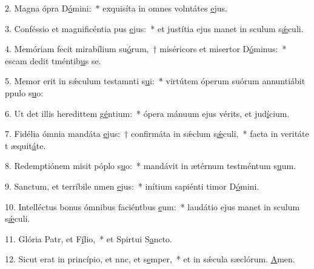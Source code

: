 2. Magna ópra D\uline{ó}mini:~* exquisíta in omnes volntátes \uline{e}jus.\par 
3. Conféssio et magnificéntia pus \uline{e}jus:~* et justítia ejus manet in sculum s\uline{ǽ}culi.\par 
4. Memóriam fecit mirabílium su\uline{ó}rum,~† miséricors et misertor D\uline{ó}minus:~* escam dedit tméntib\uline{u}s se.\par 
5. Memor erit in sǽculum testamnti s\uline{u}i:~* virtútem óperum suórum annuntiábit ppulo s\uline{u}o:\par 
6. Ut det illis heredittem g\uline{é}ntium:~* ópera mánuum ejus vérits, et jud\uline{í}cium.\par 
7. Fidélia ómnia mandáta \uline{e}jus:~† confirmáta in sǽclum s\uline{ǽ}culi,~* facta in veritáte t æquit\uline{á}te.\par 
8. Redemptiónem misit póplo s\uline{u}o:~* mandávit in ætérnum testméntum s\uline{u}um.\par 
9. Sanctum, et terríbile nmen \uline{e}jus:~* inítium sapiénti timor D\uline{ó}mini.\par 
10. Intelléctus bonus ómnibus faciéntbus \uline{e}um:~* laudátio ejus manet in sculum s\uline{ǽ}culi.\par 
11. Glória Patr, et F\uline{í}lio,~* et Spirtui S\uline{a}ncto.\par 
12. Sicut erat in princípio, et nnc, et s\uline{e}mper,~* et in sǽcula sæclórum. \uline{A}men.\par 

